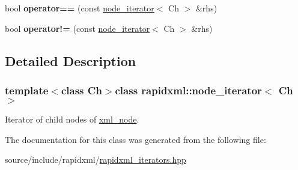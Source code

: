 \begin{DoxyCompactItemize}
\item 
\hypertarget{classrapidxml_1_1node__iterator_a5cb8a3b0d65a1a2517995e986a4debfd}{}bool {\bfseries operator==} (const \hyperlink{classrapidxml_1_1node__iterator}{node\+\_\+iterator}$<$ Ch $>$ \&rhs)\label{classrapidxml_1_1node__iterator_a5cb8a3b0d65a1a2517995e986a4debfd}

\item 
\hypertarget{classrapidxml_1_1node__iterator_a20f1e25347d7e3856694f18597f7c8e2}{}bool {\bfseries operator!=} (const \hyperlink{classrapidxml_1_1node__iterator}{node\+\_\+iterator}$<$ Ch $>$ \&rhs)\label{classrapidxml_1_1node__iterator_a20f1e25347d7e3856694f18597f7c8e2}

\end{DoxyCompactItemize}


\subsection{Detailed Description}
\subsubsection*{template$<$class Ch$>$class rapidxml\+::node\+\_\+iterator$<$ Ch $>$}

Iterator of child nodes of \hyperlink{classrapidxml_1_1xml__node}{xml\+\_\+node}. 

The documentation for this class was generated from the following file\+:\begin{DoxyCompactItemize}
\item 
source/include/rapidxml/\hyperlink{rapidxml__iterators_8hpp}{rapidxml\+\_\+iterators.\+hpp}\end{DoxyCompactItemize}
